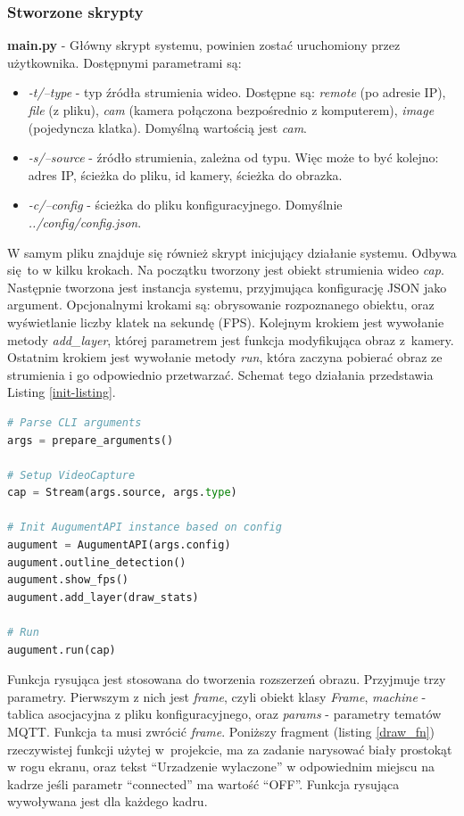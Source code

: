 \documentclass[12pt,twoside,polish]{article}
\begin{document}
\subsubsection*{Stworzone skrypty}
\textbf{main.py} - Główny skrypt systemu, powinien zostać uruchomiony przez użytkownika. Dostępnymi parametrami są:
\begin{itemize}
	\item \emph{-t/--type} - typ źródła strumienia wideo. Dostępne są: \emph{remote} (po adresie IP), \emph{file} (z pliku), \emph{cam} (kamera połączona bezpośrednio z komputerem), \emph{image} (pojedyncza klatka). Domyślną wartością jest \emph{cam}.
	\item \emph{-s/--source} - źródło strumienia, zależna od typu. Więc może to być kolejno: adres IP, ścieżka do pliku, id kamery, ścieżka do obrazka.
	\item \emph{-c/--config} - ścieżka do pliku konfiguracyjnego. Domyślnie \emph{../config/config.json}.
\end{itemize}
W samym pliku znajduje się również skrypt inicjujący działanie systemu. Odbywa się to w kilku krokach. Na początku tworzony jest obiekt strumienia wideo \emph{cap}. Następnie tworzona jest instancja systemu, przyjmująca konfigurację JSON jako argument. Opcjonalnymi krokami są: obrysowanie rozpoznanego obiektu, oraz wyświetlanie liczby klatek na sekundę (FPS). Kolejnym krokiem jest wywołanie metody \emph{add\_layer}, której parametrem jest funkcja modyfikująca obraz z~kamery. Ostatnim krokiem jest wywołanie metody \emph{run}, która zaczyna pobierać obraz ze strumienia i go odpowiednio przetwarzać. Schemat tego działania przedstawia Listing \ref{init-listing}.

\begin{lstlisting}[language=Python,caption=Uruchomienie systemu,label=init-listing]
# Parse CLI arguments
args = prepare_arguments()

# Setup VideoCapture
cap = Stream(args.source, args.type)

# Init AugumentAPI instance based on config
augument = AugumentAPI(args.config)
augument.outline_detection()
augument.show_fps()
augument.add_layer(draw_stats)

# Run 
augument.run(cap)
\end{lstlisting}

Funkcja rysująca jest stosowana do tworzenia rozszerzeń obrazu. Przyjmuje trzy parametry. Pierwszym z nich jest \emph{frame}, czyli obiekt klasy \emph{Frame}, \emph{machine} - tablica asocjacyjna z pliku konfiguracyjnego, oraz \emph{params} - parametry tematów MQTT. Funkcja ta musi zwrócić \emph{frame}. Poniższy fragment (listing \ref{draw_fn}) rzeczywistej funkcji użytej w~projekcie, ma za zadanie narysować biały prostokąt w rogu ekranu, oraz tekst \enquote{Urzadzenie wylaczone} w odpowiednim miejscu na kadrze jeśli parametr \enquote{connected} ma wartość \enquote{OFF}. Funkcja rysująca wywoływana jest dla każdego kadru.
\end{document}
